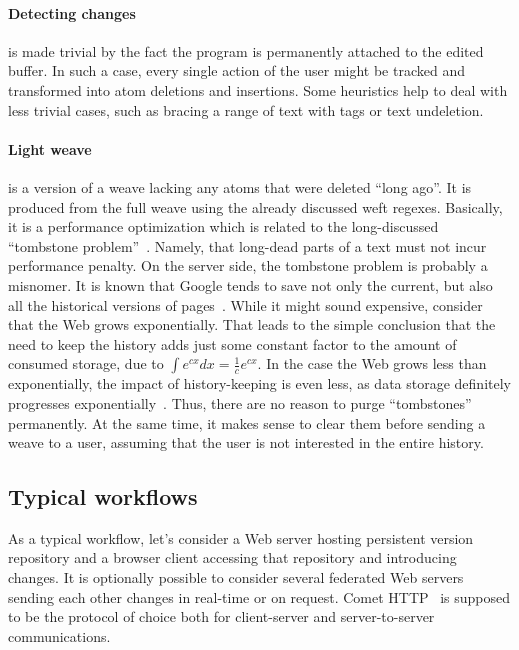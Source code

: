 \documentclass{acm_proc_article-sp}
\begin{document}
\paragraph{Detecting changes} is made trivial by the fact the program is permanently attached to the edited buffer. In such a case, every single action of the user might be tracked and transformed into atom deletions and insertions. Some heuristics help to deal with less trivial cases, such as bracing a range of text with tags or text undeletion.

\paragraph{Light weave} is a version of a weave lacking any atoms that were deleted ``long ago''. It is produced from the full weave using the already discussed weft regexes. Basically, it is a performance optimization which is related to the long-discussed ``tombstone problem''~\cite{ot}. Namely, that long-dead parts of a text must not incur performance penalty. On the server side, the tombstone problem is probably a misnomer. It is known that Google tends to save not only the current, but also all the historical versions of pages~\cite{google-history}. While it might sound expensive, consider that the Web grows exponentially. That leads to the simple conclusion that the need to keep the history adds just some constant factor to the amount of consumed storage, due to $\int e^{cx}dx = \frac{1}{c} e^{cx}$. In the case the Web grows less than exponentially, the impact of history-keeping is even less, as data storage definitely progresses exponentially~\cite{hdd}. Thus, there are no reason to purge ``tombstones'' permanently. At the same time, it makes sense to clear them before sending a weave to a user, assuming that the user is not interested in the entire history.

\subsection {Typical workflows}

As a typical workflow, let's consider a Web server hosting persistent version repository and a browser client accessing that repository and introducing changes. It is optionally possible to consider several federated Web servers sending each other changes in real-time or on request. Comet HTTP~\cite{comet} is supposed to be the protocol of choice both for client-server and server-to-server communications.
\end{document}
